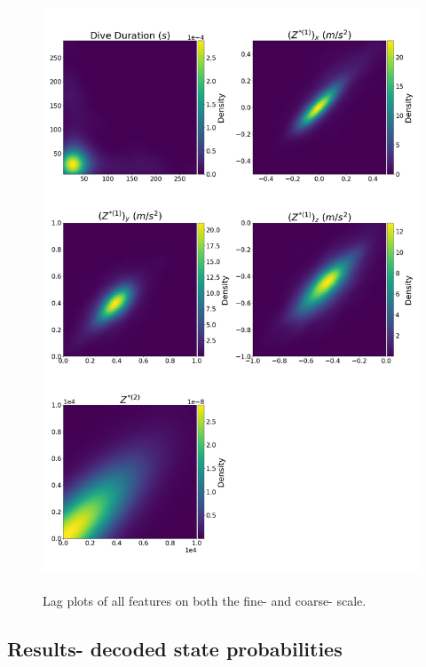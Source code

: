 \documentclass[12pt]{TD-CJS}
\begin{document}
\begin{figure}[ht]
	\centering
	\includegraphics[height=7in]{../Plots/lagplot.png}
	\caption{Lag plots of all features on both the fine- and coarse- scale.}
	\label{fig:lag}
\end{figure}

\subsection{Results- decoded state probabilities}
\end{document}
